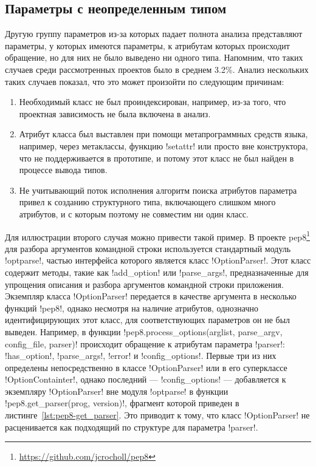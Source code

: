 \subsection{Параметры с неопределенным типом}
\label{sub:undefined-type-parameters}

Другую группу параметров из-за которых падает полнота анализа представляют
параметры, у которых имеются параметры, к атрибутам которых происходит
обращение, но для них не было выведено ни одного типа. Напомним, что таких
случаев среди рассмотренных проектов было в среднем 3.2\%. Анализ нескольких
таких случаев показал, что это может произойти по следующим причинам:

\begin{enumerate}
    \item Необходимый класс не был проиндексирован, например, из-за того, что
      проектная зависимость не была включена в анализ.

    \item Атрибут класса был выставлен при помощи метапрограммных средств языка,
      например, через метаклассы, функцию !setattr! или просто
      вне конструктора, что не поддерживается в прототипе, и потому этот класс не был
      найден в процессе вывода типов.

    \item Не учитывающий поток исполнения алгоритм поиска атрибутов параметра
      привел к созданию структурного типа, включающего слишком много
      атрибутов, и с которым поэтому не совместим ни один класс.

\end{enumerate}

Для иллюстрации второго случая можно привести такой пример. В проекте
pep8\footnote{\url{https://github.com/jcrocholl/pep8}} для разбора аргументов
командной строки используется стандартный модуль !optparse!, частью интерфейса
которого является класс !OptionParser!. Этот класс содержит методы, такие как
!add_option! или !parse_args!, 
предназначенные для упрощения описания и разбора аргументов командной строки
приложения. Экземпляр класса !OptionParser! передается в качестве аргумента в
несколько функций !pep8!, однако несмотря на наличие атрибутов, однозначно
идентифицирующих этот класс, для соответствующих параметров он не был выведен.
Например, в функции !pep8.process_options(arglist, parse_argv, config_file, parser)!
происходит обращение к атрибутам параметра
!parser!: !has_option!, !parse_args!, !error! и !config_options!. Первые три из
них определены непосредственно в классе !OptionParser! или в его суперклассе
!OptionContainter!, однако последний --- !config_options! --- добавляется к
экземпляру !OptionParser! вне модуля !optparse! в функции
!pep8.get_parser(prog, version)!, фрагмент которой приведен в
листинге~\ref{lst:pep8-get_parser}. Это приводит к тому, что класс
!OptionParser! не расценивается как подходящий по структуре для параметра
!parser!.


